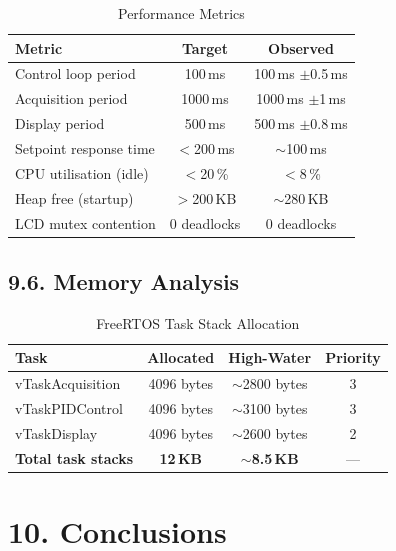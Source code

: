 \documentclass[12pt]{article}
\begin{document}
\begin{table}[H]
    \centering
    \caption{Performance Metrics}
    \begin{tabular}{|l|c|c|}
        \hline
        \textbf{Metric} & \textbf{Target} & \textbf{Observed} \\
        \hline
        Control loop period & 100\,ms & 100\,ms $\pm$0.5\,ms \\
        \hline
        Acquisition period & 1000\,ms & 1000\,ms $\pm$1\,ms \\
        \hline
        Display period & 500\,ms & 500\,ms $\pm$0.8\,ms \\
        \hline
        Setpoint response time & $<$200\,ms & $\sim$100\,ms \\
        \hline
        CPU utilisation (idle) & $<$20\,\% & $<$8\,\% \\
        \hline
        Heap free (startup) & $>$200\,KB & $\sim$280\,KB \\
        \hline
        LCD mutex contention & 0 deadlocks & 0 deadlocks \\
        \hline
    \end{tabular}
\end{table}

\subsection*{9.6. Memory Analysis}

\begin{table}[H]
    \centering
    \caption{FreeRTOS Task Stack Allocation}
    \begin{tabular}{|l|c|c|c|}
        \hline
        \textbf{Task} & \textbf{Allocated} & \textbf{High-Water} & \textbf{Priority} \\
        \hline
        vTaskAcquisition & 4096 bytes & $\sim$2800 bytes & 3 \\
        \hline
        vTaskPIDControl & 4096 bytes & $\sim$3100 bytes & 3 \\
        \hline
        vTaskDisplay & 4096 bytes & $\sim$2600 bytes & 2 \\
        \hline
        \textbf{Total task stacks} & \textbf{12\,KB} & \textbf{$\sim$8.5\,KB} & --- \\
        \hline
    \end{tabular}
\end{table}

\section*{10. Conclusions}
\end{document}
